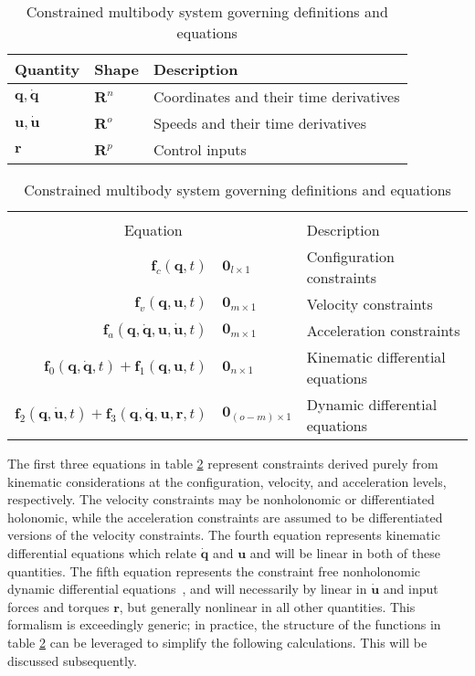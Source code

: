 \documentclass{svjour3}                     %
\begin{document}
\begin{table}[htbp]
  \centering
  \caption{Constrained multibody system governing definitions and equations}
  \label{table:assumptions}
  \begin{tabular}[c]{l l l}
    Quantity & Shape & Description\\
    \hline
    $\bm{q},\bm{\dot{q}}$ & $\mathbf{R}^n$ & Coordinates and their time
    derivatives\\
    $\bm{u}, \bm{\dot{u}}$ & $\mathbf{R}^o$ & Speeds and their time derivatives\\
    $\bm{r}$ & $\mathbf{R}^p$ & Control inputs \\
  \end{tabular}
  \begin{tabular}[c]{r @{ $=$ } l l}
    \multicolumn{3}{c}{ } \\
    \multicolumn{2}{c}{Equation} & Description \\
    \hline
    $\bm{f}_{c}(\bm{q}, t)$ & $\bm{0}_{l \times 1}$ & Configuration constraints \\
    $\bm{f}_{v}(\bm{q}, \bm{u}, t)$ & $\bm{0}_{m \times 1}$ & Velocity constraints \\
    $\bm{f}_{a}(\bm{q}, \bm{\dot{q}}, \bm{u}, \bm{\dot{u}}, t)$ & $\bm{0}_{m
    \times 1}$ & Acceleration constraints \\
    $\bm{f}_{0}(\bm{q}, \bm{\dot{q}}, t) + \bm{f}_{1}(\bm{q}, \bm{u}, t)$ &
    $\bm{0}_{n \times 1}$ & Kinematic differential equations \\
    $\bm{f}_{2}(\bm{q}, \bm{\dot{u}}, t) + \bm{f}_{3}(\bm{q}, \bm{\dot{q}},
    \bm{u}, \bm{r}, t)$ & $\bm{0}_{(o - m) \times 1}$ & Dynamic differential equations
  \end{tabular}
\end{table}
The first three equations in table \ref{table:assumptions} represent
constraints derived purely from kinematic considerations at the configuration,
velocity, and acceleration levels, respectively.  The velocity constraints may
be nonholonomic or differentiated holonomic, while the acceleration constraints
are assumed to be differentiated versions of the velocity constraints.  The
fourth equation represents kinematic differential equations which relate
$\bm{\dot{q}}$ and $\bm{u}$ and will be linear in both of these quantities.
The fifth equation represents the constraint free nonholonomic dynamic
differential equations~\cite{Kane1985}, and will necessarily by linear in
$\bm{\dot{u}}$ and input forces and torques $\bm{r}$, but generally nonlinear
in all other quantities.  This formalism is exceedingly generic; in practice,
the structure of the functions in table \ref{table:assumptions} can be
leveraged to simplify the following calculations.  This will be discussed
subsequently.
\end{document}
